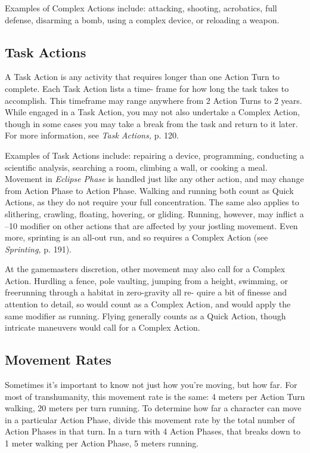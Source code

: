 Examples of Complex Actions include: attacking, 
shooting, acrobatics, full defense, disarming a bomb, 
using a complex device, or reloading a weapon.

\subsection{Task Actions}

A Task Action is any activity that requires longer than one 
Action Turn to complete. Each Task Action lists a time-
frame for how long the task takes to accomplish. This 
timeframe may range anywhere from 2 Action Turns to 2 
years. While engaged in a Task Action, you may not also 
undertake a Complex Action, though in some cases you 
may take a break from the task and return to it later. For 
more information, see \textit{Task Actions,} p. 120.

Examples of Task Actions include: repairing a 
device, programming, conducting a scientific analysis, 
searching a room, climbing a wall, or cooking a meal.
Movement in \textit{Eclipse Phase} is handled just like any 
other action, and may change from Action Phase to 
Action Phase. Walking and running both count as Quick 
Actions, as they do not require your full concentration. 
The same also applies to slithering, crawling, floating, 
hovering, or gliding. Running, however, may inflict a 
–10 modifier on other actions that are affected by your 
jostling movement. Even more, sprinting is an all-out run, 
and so requires a Complex Action (see \textit{Sprinting,} p. 191).

At the gamemasters discretion, other movement 
may also call for a Complex Action. Hurdling a fence, 
pole vaulting, jumping from a height, swimming, or 
freerunning through a habitat in zero-gravity all re-
quire a bit of finesse and attention to detail, so would 
count as a Complex Action, and would apply the 
same modifier as running. Flying generally counts as a 
Quick Action, though intricate maneuvers would call 
for a Complex Action.

\subsection{Movement Rates}

Sometimes it's important to know not just how you're 
moving, but how far. For most of transhumanity, this 
movement rate is the same: 4 meters per Action Turn 
walking, 20 meters per turn running. To determine 
how far a character can move in a particular Action 
Phase, divide this movement rate by the total number 
of Action Phases in that turn. In a turn with 4 Action 
Phases, that breaks down to 1 meter walking per 
Action Phase, 5 meters running. 

